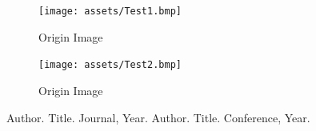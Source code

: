 \documentclass{article}
\begin{document}
\FloatBarrier
\begin{figure}[htbp]
    \centering
    \begin{minipage}[t]{0.45\textwidth}
        \centering
        \texttt{[image: assets/Test1.bmp]}
        \caption{Origin Image}
    \end{minipage}
\end{figure}
\FloatBarrier

\FloatBarrier
\begin{figure}[htbp]
    \centering
    \begin{minipage}[t]{0.45\textwidth}
        \centering
        \texttt{[image: assets/Test2.bmp]}
        \caption{Origin Image}
        \label{fig:example1}
    \end{minipage}
\end{figure}
\FloatBarrier



\begin{thebibliography}{9}
 Author. Title. Journal, Year.
 Author. Title. Conference, Year.
\end{thebibliography}
\end{document}
